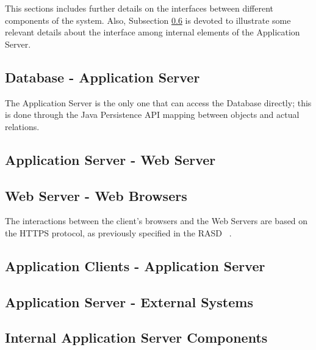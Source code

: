 This sections includes further details on the interfaces between different components of the system. Also, Subsection \ref{int_comps_if} is devoted to illustrate some relevant details about the interface among internal elements of the Application Server.

\subsection{Database - Application Server}
The Application Server is the only one that can access the Database directly; this is done through the Java Persistence API mapping between objects and actual relations.

\subsection{Application Server - Web Server}

\subsection{Web Server - Web Browsers}
The interactions between the client's browsers and the Web Servers are based on the HTTPS protocol, as previously specified in the RASD ~\cite{rasd}.

\subsection{Application Clients - Application Server}

\subsection{Application Server - External Systems}

\subsection{Internal Application Server Components}\label{int_comps_if}